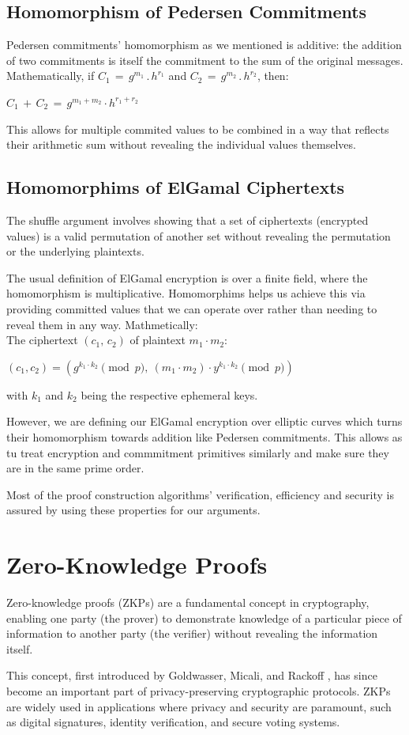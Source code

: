 \documentclass[12pt,a4paper]{report}
\begin{document}
\subsection*{Homomorphism of Pedersen Commitments}
Pedersen commitments' homomorphism as we mentioned is additive: the addition of two commitments is itself the commitment to the sum of the original messages.
Mathematically, if $C_1\,=\,g^{m_1}\,.\,h^{r_1}$ and $C_2\,=\,g^{m_2}\,.\,h^{r_2}$, then:\\ 
\begin{center}
$C_1\,+\,C_2\,=\,g^{m_1 + m_2} \cdot h ^{r_1 + r_2}$
\end{center}
This allows for multiple commited values to be combined in a way that reflects their arithmetic sum without revealing the individual values themselves.
\subsection*{Homomorphims of ElGamal Ciphertexts}
The shuffle argument involves showing that a set of ciphertexts (encrypted values) is a valid permutation of another set without revealing the permutation or the underlying plaintexts.\par
The usual definition of ElGamal encryption is over a finite field, where the homomorphism is multiplicative.
Homomorphims helps us achieve this via providing committed values that we can operate over rather than needing to reveal them in any way. Mathmetically:\\
The ciphertext $(c_1,\,c_2)$ of plaintext $m_1 \cdot m_2$:\\
\begin{center}
$(c_1, c_2) = \left( g^{k_1 \cdot k_2} \pmod p, \ (m_1 \cdot m_2) \cdot y^{k_1 \cdot k_2} \pmod p \right)$
\end{center}
with $k_1$ and $k_2$ being the respective ephemeral keys.\par
However, we are defining our ElGamal encryption over elliptic curves which turns their homomorphism towards addition like Pedersen commitments. This allows as tu treat encryption and commmitment primitives similarly and make sure they are in the same prime order.\par
Most of the proof construction algorithms' verification, efficiency and security is assured by using these properties for our arguments.

\section{Zero-Knowledge Proofs}
Zero-knowledge proofs (ZKPs) are a fundamental concept in cryptography, enabling one party 
(the prover) to demonstrate knowledge of a particular piece of information to another party 
(the verifier) without revealing the information itself.\par
This concept, first introduced by Goldwasser, Micali, and Rackoff \cite{zk}, has since become 
an important part of privacy-preserving cryptographic protocols. 
ZKPs are widely used in applications where privacy and security are paramount, 
such as digital signatures, identity verification, and secure voting systems.
\end{document}
